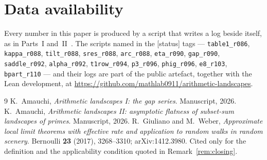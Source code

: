 \documentclass[11pt,a4paper]{article}
\theoremstyle{plain}
\theoremstyle{definition}
\theoremstyle{remark}
\begin{document}
\section*{Data availability}
Every number in this paper is produced by a script that writes a log beside itself, as in
Parts~I and~II~\cite{P1,P2}. The scripts named in the \textsf{[status]} tags ---
\texttt{table1\_r086}, \texttt{kappa\_r088}, \texttt{tilt\_r088}, \texttt{sres\_r088},
\texttt{arc\_r088}, \texttt{eta\_r090}, \texttt{gap\_r090}, \texttt{saddle\_r092},
\texttt{alpha\_r092}, \texttt{t1row\_r094}, \texttt{p3\_r096}, \texttt{phig\_r096},
\texttt{e8\_r103}, \texttt{bpart\_r110} ---
and their logs are part of the public artefact, together with the Lean development, at
\url{https://github.com/mathlab0911/arithmetic-landscapes}.

\begin{thebibliography}{9}
 K.~Amauchi, \emph{Arithmetic landscapes I: the gap series}. Manuscript, 2026.
 K.~Amauchi, \emph{Arithmetic landscapes II: asymptotic flatness of subset-sum
landscapes of primes}. Manuscript, 2026.
 R.~Giuliano and M.~Weber, \emph{Approximate local limit theorems with effective
rate and application to random walks in random scenery}. Bernoulli \textbf{23} (2017),
3268--3310; arXiv:1412.3980. Cited only for the definition and the applicability condition
quoted in Remark~\ref{rem:closing}.
\end{thebibliography}
\end{document}
